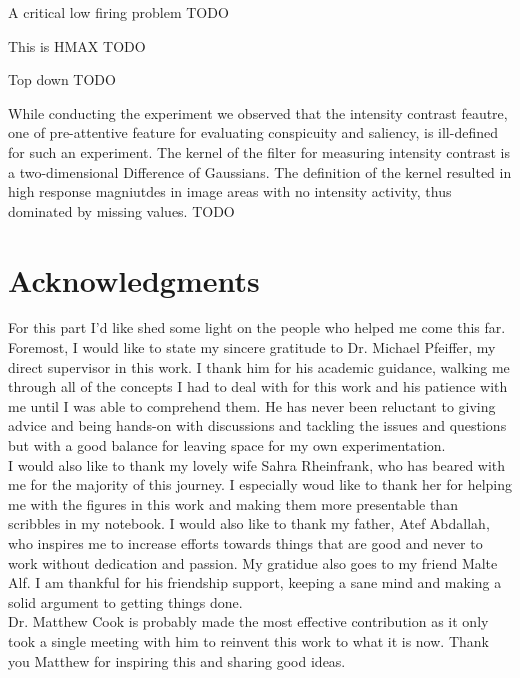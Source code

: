 \documentclass{report}
\begin{document}
A critical 
low firing problem TODO



This is HMAX TODO

Top down TODO

While conducting the experiment we observed that the intensity contrast feautre, one of pre-attentive feature for evaluating conspicuity and saliency, is ill-defined for such an experiment. The kernel of the filter for measuring intensity contrast is a two-dimensional Difference of Gaussians. The definition of the kernel resulted in high response magniutdes in image areas with no intensity activity, thus dominated by missing values. TODO



\chapter{Acknowledgments}

For this part I'd like shed some light on the people who helped me come this far.\\
Foremost, I would like to state my sincere gratitude to Dr. Michael Pfeiffer, my direct supervisor in this work. I thank him for his academic guidance, walking me through all of the concepts I had to deal with for this work and his patience with me until I was able to comprehend them. He has never been reluctant to giving advice and being hands-on with discussions and tackling the issues and questions but with a good balance for leaving space for my own experimentation.\\

I would also like to thank my lovely wife Sahra Rheinfrank, who has beared with me for the majority of this journey. I especially woud like to thank her for helping me with the figures in this work and making them more presentable than scribbles in my notebook. I would also like to thank my father, Atef Abdallah, who inspires me to increase efforts towards things that are good and never to work without dedication and passion.
My gratidue also goes to my friend Malte Alf. I am thankful for his friendship support, keeping a sane mind and making a solid argument to getting things done.\\

Dr. Matthew Cook is probably made the most effective contribution as it only took a single meeting with him to reinvent this work to what it is now. Thank you Matthew for inspiring this and sharing good ideas.\\
\end{document}
